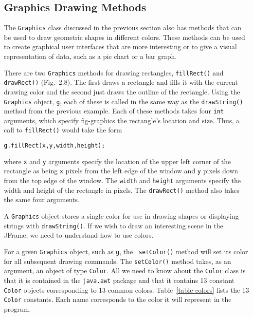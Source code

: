 \subsection{Graphics Drawing Methods}

The {\tt Graphics} class discussed in the previous section also has
methods that can be used to draw geometric shapes in different
colors. These methods can be used to create graphical user interfaces
that are more interesting or to give a visual representation of data,
such as a pie chart or a bar graph.

There are two {\tt Graphics} methods for drawing rectangles, 
{\tt fillRect()} and {\tt drawRect()} (Fig.~2.8). The
first draws a rectangle and fills it with the current drawing color
and the second just draws the outline of the rectangle.  Using the
{\tt Graphics} object, {\tt g}, each of these is called in the same
way as the {\tt drawString()} method from the previous example.  
Each of these methods takes four {\tt int} arguments, which specify 
{fig-graphics}
the rectangle's location and size. Thus, a call to {\tt fillRect()}
would take the form

\begin{jjjlisting}
\begin{lstlisting}
g.fillRect(x,y,width,height);
\end{lstlisting}
\end{jjjlisting}

\noindent where {\tt x} and {\tt y} arguments specify the location of 
the upper left corner of the rectangle as being {\tt x} pixels from
the left edge of the window and {\tt y} pixels down from the top edge
of the window. The {\tt width} and {\tt height} arguments specify the
width and height of the rectangle in pixels.  The {\tt drawRect()}
method also takes the same four arguments. 

A {\tt Graphics} object stores a single color for use in drawing
shapes or displaying strings with {\tt drawString()}.  If we wish to
draw an interesting scene in the JFrame, we need to understand
how to use colors.

For a given {\tt Graphics} object, such as {\tt g}, the {\tt
setColor()} method will set its color for all subsequent drawing
commands.  The {\tt setColor()} method takes, as an argument, an
object of type {\tt Color}.  All we need to know about the {\tt Color}
class is that it is contained in the {\tt java.awt} package and that
it contains 13 constant {\tt Color} objects corresponding to 13 common
colors.  Table~\ref{table-colors} lists the 13 {\tt Color}
constants. Each name corresponds to the color it will represent in the
program.

